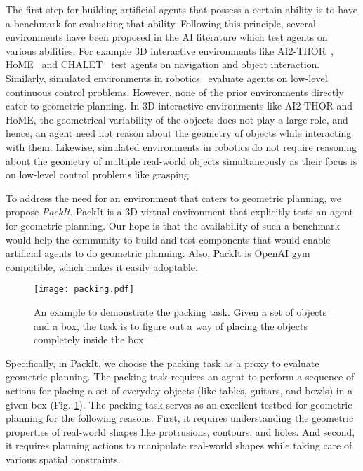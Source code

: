 \documentclass{article}
\begin{document}
The first step for building artificial agents that possess a certain ability is to have a benchmark for evaluating that ability. Following this principle, several environments have been proposed in the AI literature which test agents on various abilities. For example 3D interactive environments like  AI2-THOR~\cite{ai2thor}, HoME~\cite{brodeur2017home} and CHALET~\cite{yan2018chalet} test agents on navigation and object interaction. Similarly, simulated environments in robotics~\cite{plappert2018multi} evaluate agents on low-level continuous control problems. However, none of the prior environments directly cater to geometric planning. In 3D interactive environments like AI2-THOR and HoME, the geometrical variability of the objects does not play a large role, and hence, an agent need not reason about the geometry of objects while interacting with them. Likewise, simulated environments in robotics do not require reasoning about the geometry of multiple real-world objects simultaneously as their focus is on low-level control problems like grasping.

To address the need for an environment that caters to geometric planning, we propose \textit{PackIt}. PackIt is a 3D virtual environment that explicitly tests an agent for geometric planning. Our hope is that the availability of such a benchmark would help the community to build and test components that would enable artificial agents to do geometric planning. Also, PackIt is OpenAI gym~\cite{openai} compatible, which makes it easily adoptable.

\begin{figure}[b]
  \centering
  \texttt{[image: packing.pdf]}
  \caption{An example to demonstrate the packing task. Given a set of objects and a box, the task is to figure out a way of placing the objects completely inside the box.}
  \centering
  \label{fig:packing}
\end{figure}

Specifically, in PackIt, we choose the packing task as a proxy to evaluate geometric planning. The packing task requires an agent to perform a sequence of actions for placing a set of everyday objects (like tables, guitars, and bowls) in a given box (Fig. \ref{fig:packing}). The packing task serves as an excellent testbed for geometric planning for the following reasons. First, it requires understanding the geometric properties of real-world shapes like protrusions, contours, and holes. And second, it requires planning actions to manipulate real-world shapes while taking care of various spatial constraints.
\end{document}

